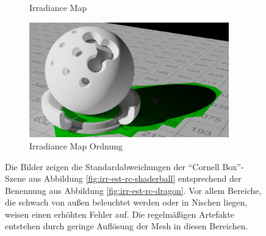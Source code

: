 \begin{figure}[h]
\begin{subfigure}[b]{0.5\textwidth}
			\caption{Irradiance Map}
		\end{subfigure}
		\begin{subfigure}[b]{0.5\textwidth}
			\center
			\includegraphics[width=0.95\textwidth]{pic/irrmap-shaderball-irrmap-order.png}
			\caption{Irradiance Map Ordnung}
		\end{subfigure}
		\caption[Irradiance-Map anhand der \enquote{Cornell Box}-Szene]{Die Bilder zeigen die Standardabweichungen der \enquote{Cornell Box}-Szene aus Abbildung \ref{fig:irr-est-rc-shaderball} entsprechend der Benennung aus Abbildung \ref{fig:irr-est-rc-dragon}. Vor allem Bereiche, die schwach von außen beleuchtet werden oder in Nischen liegen, weisen einen erhöhten Fehler auf. Die regelmäßigen Artefakte entstehen durch geringe Auflösung der Mesh in diesen Bereichen.}
		\label{fig:irr-map-cornell}
	\end{figure}

